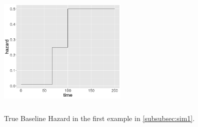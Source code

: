 \documentclass[ba]{imsart}
\begin{document}
\begin{table}
\begin{center}
\end{center}
\caption{Comparison metrics in terms of MSE and posterior coverage rate from 300 independent replications, for the 100 frailty effects in the first simulation study in section \ref{subsubsec:sim1}.}
\label{table:Sim1AggRandom}
\end{table}



\begin{figure}[ht]
\centering
\includegraphics[width=0.55\textwidth,height=2.5in]{base_sim1.png}
\caption{True Baseline Hazard in the first example in \ref{subsubsec:sim1}.}
\label{fig:truebase1}
\end{figure}
\end{document}
